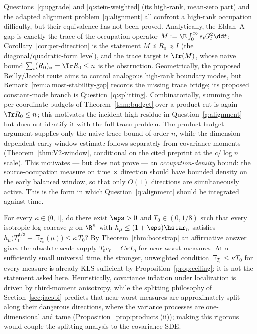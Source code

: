 \documentclass[../../main.tex]{subfiles}
\begin{document}
\begin{remark}
\label{rem:trace-upgrade-unification}
Questions~\ref{q:upgrade} and \ref{q:stein-weighted} (its high-rank, mean-zero part) and the
adapted alignment problem~\ref{q:alignment} all confront a high-rank occupation difficulty, but
their equivalence has not been proved. Analytically, the Eldan--A gap is exactly the trace of the occupation
operator $M:=\E\int_0^\infty s_t G_t^2\dd t$: Corollary~\ref{cor:per-direction} is the
statement $M\preceq R_0\preceq I$ (the diagonal/quadratic-form level), and the trace target is
$\Tr(M)$, whose naive bound $\sum_i(R_0)_{ii}=\Tr R_0\le n$ is the obstruction. Geometrically,
the proposed Reilly/Jacobi route aims to control analogous high-rank boundary modes, but
Remark~\ref{rem:almost-stability-gap} records the missing trace bridge; its proposed
constant-mode branch is Question~\ref{q:splitting}. Combinatorially, summing the per-coordinate
budgets of Theorem~\ref{thm:budget} over a product cut is again $\Tr R_0\le n$; this motivates
the incident-high residue in Question~\ref{q:alignment} but does not identify it with the full
trace problem. The product budget argument supplies only the naive trace bound of
order $n$, while the dimension-dependent early-window estimate follows separately from
covariance moments (Theorem~\ref{thm:V2-window}, conditional on the cited preprint at the
$c/\log n$ scale). This motivates --- but does not prove --- an \emph{occupation-density}
bound: the source-occupation measure on time$\,\times\,$direction should have bounded density
on the early balanced window, so that only $O(1)$ directions are simultaneously active. This is the form in which
Question~\ref{q:alignment} should be integrated against time.
\end{remark}

\begin{question}
\label{q:taming}
For every $\kappa\in(0,1]$, do there exist $\eps>0$ and $T_0\in(0,1/8)$ such that every
isotropic log-concave $\mu$
on $\R^n$ with $h_\mu\le(1+\eps)\hstar_n$ satisfies
$h_\mu\bigl(T_0^{4/3}+\Xi_{T_0}(\mu)\bigr)\le\kappa\,T_0$? By
Theorem~\ref{thm:bootstrap} an affirmative answer gives the absolute-scale supply
$T_0e_0+C\kappa T_0$ for near-worst measures. At a sufficiently small universal time, the
stronger, unweighted condition $\Xi_{T_0}\le\kappa T_0$ for every measure is already KLS-sufficient by
Proposition~\ref{prop:ceiling}; it is not the statement asked here. Heuristically, covariance
inflation under localization is driven by third-moment anisotropy, while the splitting
philosophy of Section~\ref{sec:jacobi} predicts that near-worst measures are approximately
split along their dangerous directions, where the variance processes are one-dimensional and
tame (Proposition~\ref{prop:products}(ii)); making this rigorous would couple the splitting
analysis to the covariance SDE.
\end{question}
\end{document}
